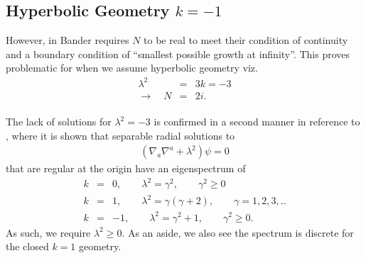 \documentclass[10pt,letterpaper]{article}
\numberwithin{equation}{section}
\begin{document}
\subsection{Hyperbolic Geometry $k=-1$}
However, in \cite{bander1966group} Bander requires $N$ to be real to meet their condition of continuity and a boundary condition of ``smallest possible growth at infinity''. This proves problematic for when we assume hyperbolic geometry viz. \begin{eqnarray}
\lambda^2&=&3k=-3
\nonumber\\ 
\to\quad N&=&2i.
\end{eqnarray}
\\ 
The lack of solutions for $\lambda^2=-3$ is confirmed in a second manner in reference to \cite{Harrison1967}, where it is shown that separable radial solutions to 
\begin{eqnarray}
(\nabla_a\nabla^a + \lambda^2)\psi=0
\end{eqnarray}
that are regular at the origin have an eigenspectrum of
\begin{eqnarray}
k&=&0,\qquad \lambda^2 = \gamma^2,\qquad \gamma^2\ge 0
\nonumber\\
k&=&1,\qquad \lambda^2=\gamma(\gamma+2),\qquad \gamma=1,2,3,..
\nonumber\\
k&=&-1,\qquad \lambda^2=\gamma^2+1,\qquad \gamma^2\ge 0.
\label{eigens}
\end{eqnarray}
As such, we require $\lambda^2 \ge 0$. As an aside, we also see the spectrum is discrete for the closed $k=1$ geometry. 
\end{document}
